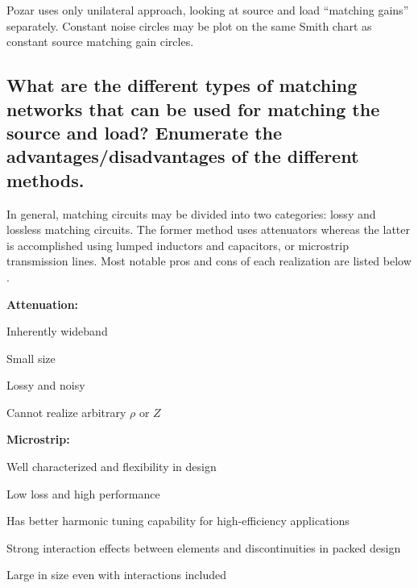 \documentclass[a4paper, 12pt]{article}
\newlength{\oneLine}
\begin{document}
Pozar uses only unilateral approach, looking at source and load ``matching gains'' 
separately. Constant noise circles may be plot on the same Smith chart as constant 
source matching gain circles.


\subsection{What are the different types of matching networks that can be used for 
	matching the source and load? Enumerate the advantages/disadvantages of the different methods.}

In general, matching circuits may be divided into two categories: lossy and lossless matching 
circuits. The former method uses attenuators whereas the latter is accomplished using lumped 
inductors and capacitors, or microstrip transmission lines. Most notable pros and cons of
each realization are listed below \cite{bahl}.
\vspace*{\oneLine}

\noindent\textbf{Attenuation:}
\vspace*{-0.5\oneLine}
\begin{description}[font=\rmfamily\mdseries, leftmargin=15mm, style=sameline, align=right, labelsep=5mm, itemsep=-2pt]
	\item[\boldmath$+$\unboldmath]	Inherently wideband
	\item[\boldmath$+$\unboldmath] 	Small size
	\item[\boldmath$-$\unboldmath] 	Lossy and noisy
	\item[\boldmath$-$\unboldmath] 	Cannot realize arbitrary $\rho$ or $Z$
\end{description}

\noindent\textbf{Microstrip:}
\vspace*{-0.5\oneLine}
\begin{description}[font=\rmfamily\mdseries, leftmargin=15mm, style=sameline, align=right, labelsep=5mm, itemsep=-2pt]
	\item[\boldmath$+$\unboldmath]	Well characterized and flexibility in design
	\item[\boldmath$+$\unboldmath] 	Low loss and high performance
	\item[\boldmath$+$\unboldmath] 	Has better harmonic tuning capability for high-efficiency applications
	\item[\boldmath$-$\unboldmath] 	Strong interaction effects between elements and discontinuities in packed design
	\item[\boldmath$-$\unboldmath] 	Large in size even with interactions included
\end{description}
\end{document}
